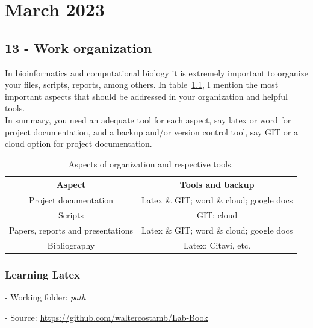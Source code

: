 \documentclass[12pt,a4paper]{report}
\title{\titulo}
\author{\autor}
\date{2023}
\begin{document}
 \maketitle
 \tableofcontents
 \newpage


 \chapter{March 2023}
 
 \section{13 - Work organization}
 In bioinformatics and computational biology it is extremely important to organize your files, scripts, reports, among others. In table~\ref{aspects}, I mention the most important aspects that should be addressed in your organization and helpful tools. \\
 
 In summary, you need an adequate tool for each aspect, say latex or word for project documentation, and a backup and/or version control tool, say GIT or a cloud option for project documentation.

\begin{table}[!htb]
  \caption{Aspects of organization and respective tools.}
  \label{aspects}
  \centering
  \begin{tabular}{cc}
  \hline 
	Aspect&Tools and backup \\
  \hline
       Project documentation&Latex \& GIT; word \& cloud; google docs  \\
       Scripts& GIT; cloud \\
       Papers, reports and presentations& Latex \& GIT; word \& cloud; google docs \\
       Bibliography& Latex; Citavi, etc. \\
  \hline
  \end{tabular}
 \end{table}
 
 \subsection{Learning Latex}
 \hspace{0.2cm}
 \begin{tcolorbox}[width=6.3in]
 \scriptsize 
 - Working folder: \textit{path}
 
 - Source: \url{https://github.com/waltercostamb/Lab-Book}
 \end{tcolorbox}
 \hspace{0.2cm}
 \normalsize  
 
\end{document}
